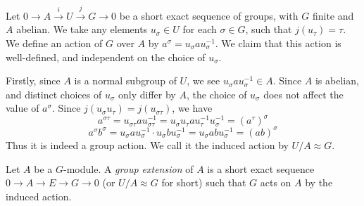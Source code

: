 


\begin{analysis}
    Let $0\to A\xrightarrow iU\xrightarrow jG\to 0$ be a short exact sequence of groups, with $G$ finite and $A$ abelian. We take any elements $u_\sigma\in U$ for each $\sigma\in G$, such that $j(u_\tau)=\tau$. We define an action of $G$ over $A$ by $a^\sigma=u_\sigma au_\sigma^{-1}$. We claim that this action is well-defined, and independent on the choice of $u_\sigma$.

    Firstly, since $A$ is a normal subgroup of $U$, we see $u_\sigma au_\sigma^{-1}\in A$. Since $A$ is abelian, and distinct choices of $u_\sigma$ only differ by $A$, the choice of $u_\sigma$ does not affect the value of $a^\sigma$. Since $j(u_\sigma u_\tau)=j(u_{\sigma\tau})$, we have \[ a^{\sigma\tau}=u_{\sigma\tau}au_{\sigma\tau}^{-1}=u_\sigma u_\tau au_\tau^{-1}u_\sigma^{-1}=(a^\tau)^\sigma \] \[ a^\sigma b^\sigma=u_\sigma au_\sigma^{-1}\cdot u_\sigma bu_\sigma^{-1}=u_\sigma abu_\sigma^{-1}=(ab)^\sigma \] Thus it is indeed a group action. We call it the induced action by $U/A\approx G$.
\end{analysis}

\begin{definition}
    Let $A$ be a $G$-module. A \emph{group extension} of $A$ is a short exact sequence $0\to A\to E\to G\to 0$ (or $U/A\approx G$ for short) such that $G$ acts on $A$ by the induced action.
\end{definition}


